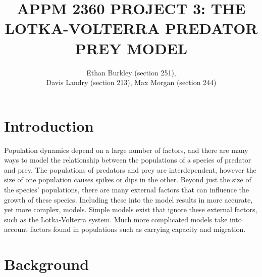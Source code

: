 \documentclass[12pt]{article}   %
\theoremstyle{definition}
\numberwithin{equation}{section}
\begin{document}
\parskip10pt
\parindent0pt
\baselineskip15pt



\title{APPM 2360 PROJECT 3: THE LOTKA-VOLTERRA PREDATOR PREY MODEL}
\author{Ethan Burkley (section 251), \\ Davis Landry (section 213), Max Morgan (section 244)}


\pagestyle{fancy}
\renewcommand{\sectionmark}[1]{\markright{#1}{}}

\fancyhf{}

\rhead{\fancyplain{}{\thepage}} %
\lhead{\fancyplain{}{\rightmark }} %

\maketitle

\newpage
\setcounter{page}{2}
\section{Introduction} \label{APPM2360proj01sec01}

Population dynamics depend on a large number of factors, and there are many ways to model the relationship between the populations of a species of predator and prey. The populations of predators and prey are interdependent, however the size of one population causes spikes or dips in the other. Beyond just the size of the species' populations, there are many external factors that can influence the growth of these species. Including these into the model results in more accurate, yet more complex, models. Simple models exist that ignore these external factors, such as the Lotka-Volterra system. Much more complicated models take into account factors found in populations such as carrying capacity and migration.
 
\newpage
\setcounter{page}{3}
\section{Background} \label{APPM2360proj01sec01}



\newpage
\setcounter{page}{4}
\end{document}
